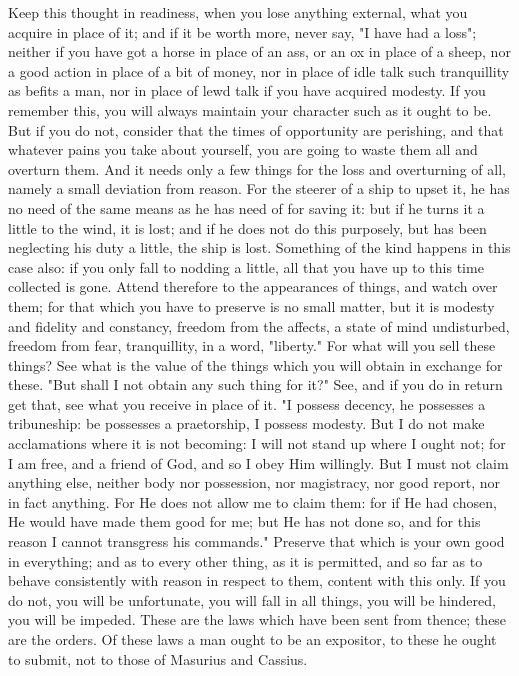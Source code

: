 \documentclass[a4paper]{article}
\begin{document}
    Keep this thought in readiness, when you lose anything external, what you
acquire in place of it; and if it be worth more, never say, "I have had a
loss"; neither if you have got a horse in place of an ass, or an ox in place of
a sheep, nor a good action in place of a bit of money, nor in place of idle
talk such tranquillity as befits a man, nor in place of lewd talk if you have
acquired modesty. If you remember this, you will always maintain your character
such as it ought to be. But if you do not, consider that the times of
opportunity are perishing, and that whatever pains you take about yourself, you
are going to waste them all and overturn them. And it needs only a few things
for the loss and overturning of all, namely a small deviation from reason. For
the steerer of a ship to upset it, he has no need of the same means as he has
need of for saving it: but if he turns it a little to the wind, it is lost; and
if he does not do this purposely, but has been neglecting his duty a little,
the ship is lost. Something of the kind happens in this case also: if you only
fall to nodding a little, all that you have up to this time collected is gone.
Attend therefore to the appearances of things, and watch over them; for that
which you have to preserve is no small matter, but it is modesty and fidelity
and constancy, freedom from the affects, a state of mind undisturbed, freedom
from fear, tranquillity, in a word, "liberty." For what will you sell these
things? See what is the value of the things which you will obtain in exchange
for these. "But shall I not obtain any such thing for it?" See, and if you do
in return get that, see what you receive in place of it. "I possess decency, he
possesses a tribuneship: be possesses a praetorship, I possess modesty. But I
do not make acclamations where it is not becoming: I will not stand up where I
ought not; for I am free, and a friend of God, and so I obey Him willingly. But
I must not claim anything else, neither body nor possession, nor magistracy,
nor good report, nor in fact anything. For He does not allow me to claim them:
for if He had chosen, He would have made them good for me; but He has not done
so, and for this reason I cannot transgress his commands." Preserve that which
is your own good in everything; and as to every other thing, as it is
permitted, and so far as to behave consistently with reason in respect to them,
content with this only. If you do not, you will be unfortunate, you will fall
in all things, you will be hindered, you will be impeded. These are the laws
which have been sent from thence; these are the orders. Of these laws a man
ought to be an expositor, to these he ought to submit, not to those of Masurius
and Cassius.
\end{document}
